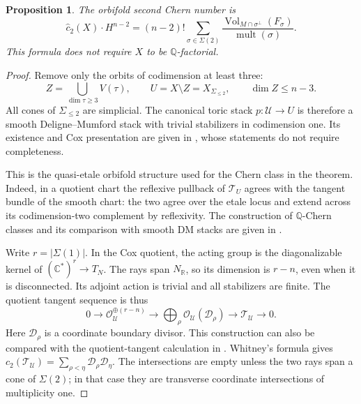 \documentclass[12pt]{amsart}
\newtheorem{prop}[thm]{Proposition}
\theoremstyle{definition}
\theoremstyle{remark}
\numberwithin{equation}{section}
\theoremstyle{plain}
\theoremstyle{definition}
\theoremstyle{remark}
\begin{document}
\begin{prop}\label{en:prop:chern}
The orbifold second Chern number is
\begin{equation}\label{en:eq:chern}
 \widehat c_2(X)\cdot H^{n-2}
 =(n-2)!\sum_{\sigma\in\Sigma(2)}
 \frac{\operatorname{Vol}_{M\cap\sigma^\perp}(F_\sigma)}
      {\operatorname{mult}(\sigma)}.
\end{equation}
This formula does not require $X$ to be $\mathbb Q$-factorial.
\end{prop}
\begin{proof}
Remove only the orbits of codimension at least three:
\begin{equation}\label{en:eq:open}
 Z=\bigcup_{\dim\tau\ge3}V(\tau),\qquad
 U=X\setminus Z=X_{\Sigma_{\le2}},\qquad
 \dim Z\le n-3.
\end{equation}
All cones of $\Sigma_{\le2}$ are simplicial. The canonical toric stack
$p:\mathcal U\to U$ is therefore a smooth Deligne--Mumford stack with trivial stabilizers in codimension one. Its existence and Cox presentation are given in
\cite[Theorem~4.11 and Corollary~4.13]{en:FMN}, whose statements do not require completeness.

This is the quasi-etale orbifold structure used for the Chern class in the theorem. Indeed, in a quotient chart the reflexive pullback of $\mathcal T_U$ agrees with the tangent bundle of the smooth chart: the two agree over the etale locus and extend across its codimension-two complement by reflexivity. The construction of $\mathbb Q$-Chern classes and its comparison with smooth DM stacks are given in \cite[Theorem~3.13 and \S\S3.10--3.11 of the arXiv version]{en:GKPT}.

Write $r=|\Sigma(1)|$. In the Cox quotient, the acting group is the diagonalizable kernel of $(\mathbb C^*)^r\to T_N$. The rays span $N_{\mathbb R}$, so its dimension is $r-n$, even when it is disconnected. Its adjoint action is trivial and all stabilizers are finite. The quotient tangent sequence is thus
\begin{equation}\label{en:eq:euler-stack}
 0\longrightarrow\mathcal O_{\mathcal U}^{\oplus(r-n)}
 \longrightarrow\bigoplus_\rho\mathcal O_{\mathcal U}(\mathcal D_\rho)
 \longrightarrow\mathcal T_{\mathcal U}\longrightarrow0.
\end{equation}
Here $\mathcal D_\rho$ is a coordinate boundary divisor. This construction can also be compared with the quotient-tangent calculation in \cite[\S4.1]{en:EM}. Whitney's formula gives
$c_2(\mathcal T_{\mathcal U})=\sum_{\rho<\eta}\mathcal D_\rho\mathcal D_\eta$.
The intersections are empty unless the two rays span a cone of $\Sigma(2)$; in that case they are transverse coordinate intersections of multiplicity one.


\end{proof}
\end{document}
